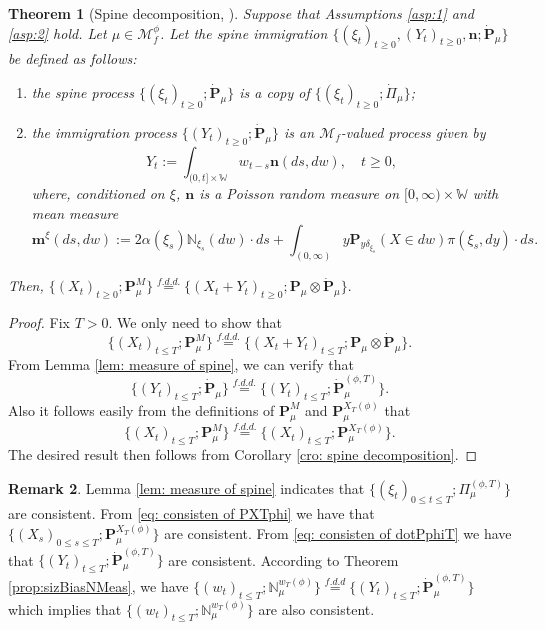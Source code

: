 \documentclass[UTF8]{pkuthss}
\theoremstyle{plain}
\newtheorem{thm}{Theorem}[section]
\theoremstyle{definition}
\newtheorem{rem}[thm]{Remark}
\numberwithin{equation}{section}
\begin{document}
\begin{thm}[{Spine decomposition, \cite{EckhoffKyprianouWinkel2015Spines, EnglanderKyprianou2004Local,LiuRenSong2009Log}}]
\label{thm:spinDec}
	Suppose that Assumptions \ref{asp:1} and \ref{asp:2} hold.
	Let $\mu \in \mathcal M_f^\phi$.
Let the spine immigration
	$\{(\xi_t)_{t\geq 0}, (Y_t)_{t\geq 0}, \mathbf n; \dot {\mathbf P}_\mu\}$ be defined as follows:
\begin{enumerate}
\item
	the \emph{spine process} $\{(\xi_t)_{t\geq 0}; \dot{\mathbf P}_\mu\}$ is a copy of $\{(\xi_t)_{t\geq 0}; \dot{\Pi}_{\mu}\}$;
\item
	the \emph{immigration process} $\{(Y_t)_{t\geq 0}; \dot{\mathbf P}_\mu\}$ is an $\mathcal M_f$-valued process given by
\[
	Y_t
	:= \int_{(0,t] \times \mathbb W} w_{t-s} \mathbf n(ds,dw),
	\quad t \geq 0,
\]
	where, conditioned on $\xi$, $\mathbf n$ is a Poisson random measure on $[0,\infty) \times \mathbb W$ with mean measure
\[
	\mathbf m^\xi(ds,dw)
:=  2 \alpha(\xi_s)\mathbb N_{\xi_s}(dw)\cdot ds
+ \int_{(0,\infty)} y \mathbf P_{y \delta_{\xi_s}}(X\in dw) \pi(\xi_s,dy)\cdot ds.
\]
\end{enumerate}
	Then,
$
    \{(X_t)_{t\geq 0}; \mathbf P_\mu^M\}
    \overset{f.d.d.}{=} \{(X_t + Y_t)_{t\geq 0}; \mathbf P_\mu \otimes\dot{\mathbf P}_\mu\}.
$
\end{thm}	

\begin{proof}
	Fix $T>0$.
	We only need to show that
\[
	\{(X_t)_{t\leq T}; \mathbf P_\mu^M\}
	\overset{f.d.d.}{=} \{(X_t + Y_t)_{t\leq T}; \mathbf P_\mu\otimes\dot{\mathbf P}_\mu\}.
\]
From Lemma \ref{lem: measure of spine},
	we can verify that
\begin{equation}
\label{eq: consisten of dotPphiT}
	\{(Y_t)_{t\leq T}; \dot{\mathbf P}_\mu\}
	\overset{f.d.d.}{=} \{(Y_t)_{t\leq T}; \dot{\mathbf P}^{(\phi,T)}_\mu\}.
\end{equation}
Also it follows easily from the definitions of $\mathbf P_\mu^M$ and $\mathbf P_\mu^{X_T(\phi)}$ that
\begin{equation}
\label{eq: consisten of PXTphi}
	\{(X_t)_{t\leq T}; \mathbf P_\mu^M\}
	\overset{f.d.d.}{=} \{(X_t)_{t\leq T}; \mathbf P_\mu^{X_T(\phi)}\}.	
\end{equation}
	The desired result then follows from Corollary \ref{cro: spine decomposition}.
\end{proof}
\begin{rem}
\label{rem: consistency}
	Lemma \ref{lem: measure of spine} indicates that $\{(\xi_t)_{0\leq t\leq T};\Pi_\mu^{(\phi, T)}\}$
		are consistent.
	From \eqref{eq: consisten of PXTphi} we have that $\{(X_s)_{0\leq s\leq T};\mathbf P_\mu^{X_T(\phi)}\}$
		are consistent.
	From \eqref{eq: consisten of dotPphiT} we have that $\{(Y_t)_{t\leq T}; \dot{\mathbf P}^{(\phi,T)}_\mu\}$
		are consistent.
	According to Theorem \ref{prop:sizBiasNMeas}, we have $\{(w_t)_{t\leq T}; \mathbb N^{w_T(\phi)}_\mu\} \overset{f.d.d}{=}\{(Y_t)_{t\leq T}; \dot{\mathbf P}^{(\phi,T)}_\mu\}$ which implies that $\{(w_t)_{t\leq T}; \mathbb N^{w_T(\phi)}_\mu\}$ are
	also consistent.
\end{rem}
\end{document}
